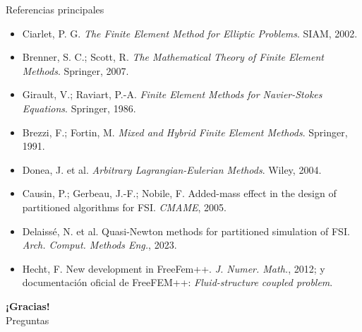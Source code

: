 \begin{frame}{Referencias principales}
  \footnotesize
  \begin{itemize}
    \item Ciarlet, P. G. \textit{The Finite Element Method for Elliptic Problems}. SIAM, 2002.
    \item Brenner, S. C.; Scott, R. \textit{The Mathematical Theory of Finite Element Methods}. Springer, 2007.
    \item Girault, V.; Raviart, P.-A. \textit{Finite Element Methods for Navier-Stokes Equations}. Springer, 1986.
    \item Brezzi, F.; Fortin, M. \textit{Mixed and Hybrid Finite Element Methods}. Springer, 1991.
    \item Donea, J. et al. \textit{Arbitrary Lagrangian-Eulerian Methods}. Wiley, 2004.
    \item Causin, P.; Gerbeau, J.-F.; Nobile, F. Added-mass effect in the design of partitioned algorithms for FSI. \textit{CMAME}, 2005.
    \item Delaissé, N. et al. Quasi-Newton methods for partitioned simulation of FSI. \textit{Arch. Comput. Methods Eng.}, 2023.
    \item Hecht, F. New development in FreeFem++. \textit{J. Numer. Math.}, 2012; y documentación oficial de FreeFEM++: \textit{Fluid-structure coupled problem}.
  \end{itemize}
\end{frame}

\begin{frame}
    \begin{center}
        \Huge \textbf{¡Gracias!} \\
        \vspace{0.6cm}
        \Large Preguntas
    \end{center}
\end{frame}



